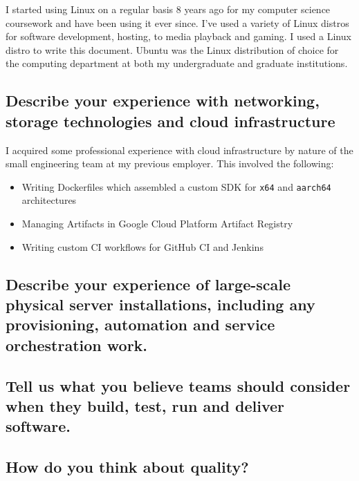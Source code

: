\documentclass{article}
\begin{document}
I started using Linux on a regular basis 8 years ago for my computer science
coursework and have been using it ever since. I've used a variety of Linux
distros for software development, hosting, to media playback and gaming. I
used a Linux distro to write this document. Ubuntu was the Linux distribution of
choice for the computing department at both my undergraduate and graduate institutions.

\subsection{Describe your experience with networking, storage technologies and
  cloud infrastructure}

I acquired some professional experience with cloud infrastructure by nature of the
small engineering team at my previous employer. This involved the following:
\begin{itemize}
  \item Writing Dockerfiles which assembled a custom SDK for \texttt{x64} and
        \texttt{aarch64} architectures
  \item Managing Artifacts in Google Cloud Platform Artifact Registry
  \item Writing custom CI workflows for GitHub CI and Jenkins
\end{itemize}

\subsection{Describe your experience of large-scale physical server
  installations, including any provisioning, automation and service orchestration
  work.}
\subsection{Tell us what you believe teams should consider when they build,
  test, run and deliver software.}
\subsection{How do you think about quality?}
\end{document}
